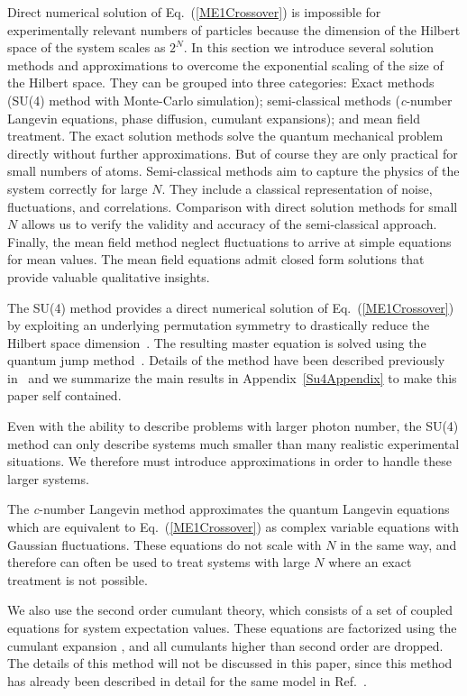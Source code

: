 \documentclass[aps,
twocolumn,
superscriptaddress,groupedaddress]{revtex4}
\begin{document}
Direct numerical solution of Eq.~(\ref{ME1Crossover}) is impossible for
experimentally relevant numbers of particles because the dimension of
the Hilbert space of the system scales as $2^N$.  In this section we
introduce several solution methods and approximations to overcome the
exponential scaling of the size of the Hilbert space.  They can be
grouped into three categories: Exact methods (SU(4) method with
Monte-Carlo simulation); semi-classical methods ({\it c}-number Langevin
equations, phase diffusion, cumulant expansions); and mean field
treatment.  The exact solution methods solve the quantum mechanical
problem directly without further approximations.  But of course they are
only practical for small numbers of atoms.  Semi-classical methods aim
to capture the physics of the system correctly for large $N$.  They
include a classical representation of noise, fluctuations, and
correlations.  Comparison with direct solution methods for small $N$
allows us to verify the validity and accuracy of the semi-classical
approach.  Finally, the mean field method neglect fluctuations to arrive
at simple equations for mean values.  The mean field equations admit
closed form solutions that provide valuable qualitative insights.

The SU(4) method provides a direct numerical solution of
Eq.~(\ref{ME1Crossover}) by exploiting an underlying permutation
symmetry to drastically reduce the Hilbert space
dimension~\cite{Hartmann:arXiv1201.1732, PhysRevA.87.062101}.  The
resulting master equation is solved using the quantum jump
method~\cite{Dalibard92,Dum92,Knight98}.  Details of the method have
been described previously in~\cite{PhysRevA.87.062101} and we summarize
the main results in Appendix~\ref{Su4Appendix} to make this paper self
contained.

Even with the ability to describe problems with larger photon number, the SU(4) method can only describe systems much smaller than many realistic experimental situations. We therefore must introduce approximations in order to handle these larger systems.

The {\it c}-number Langevin method \cite{Scully97, PhysRevA.47.1431} approximates the quantum
Langevin equations which are equivalent to Eq.~(\ref{ME1Crossover}) as complex variable equations with Gaussian fluctuations.
These equations do not scale with $N$ in the same way, and therefore can often be used to treat systems with large $N$ where an exact treatment is not possible. 

We also use the second order cumulant theory, which consists of a set of coupled equations for system expectation values. These equations are factorized using the cumulant expansion \cite{JPSJ.17.1100}, and all cumulants higher than second order are dropped. The details of this method will not be discussed in this paper, since this method has already been described in detail for the same model in Ref.~\cite{PhysRevLett.102.163601}.
\end{document}
